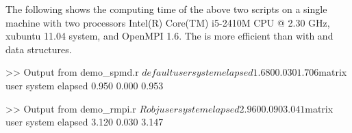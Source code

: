 The following shows the computing time of the above two scripts
on a single machine with two processors
Intel(R) Core(TM) i5-2410M CPU @ 2.30 GHz, xubuntu 11.04 system,
and OpenMPI 1.6.
The  is more efficient than  with
 and  data structures.
\begin{CodeOutput}
>> Output from demo_spmd.r
$default
   user  system elapsed
  1.680   0.030   1.706

$matrix
   user  system elapsed
  0.950   0.000   0.953

>> Output from demo_rmpi.r
$Robj
   user  system elapsed
  2.960   0.090   3.041

$matrix
   user  system elapsed
  3.120   0.030   3.147
\end{CodeOutput}
